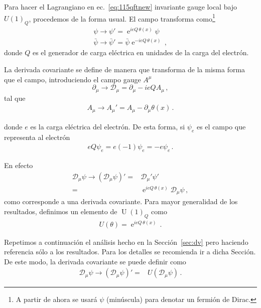 \begin{frame}
Para hacer el Lagrangiano en ec.~\eqref{eq:115qftnew} invariante gauge local bajo $U(1)_Q$, procedemos de la forma usual. El campo transforma como\footnote{A partir de ahora se usará $\psi$ (minúscula) para denotar un fermión de Dirac.}
\begin{align}
  \psi\to\psi'=\operatorname{e}^{ieQ\, \theta(x)}\psi\nonumber\\
  \bar{\psi}\to\bar{\psi}'=\bar{\psi}\operatorname{e}^{-ieQ\,\theta(x)}\,,
\end{align}
donde $Q$ es el generador de carga eléctrica en unidades de la carga del electrón.

La derivada covariante se define de manera que transforma de la misma forma que el campo, introduciendo el campo gauge $A^\mu$
\begin{equation}
  \label{eq:202qft}
  \partial_\mu\to\mathcal{D}_\mu=\partial_\mu-ieQA_\mu\,,
\end{equation}
tal que
\begin{align}
  A_{\mu}\to A_{\mu}'=A_{\mu}-\partial_{\mu}\theta(x)\,.
\end{align}

donde $e$ es la carga eléctrica del electrón. De esta forma, si $\psi_e$ es el campo que representa al electrón
\begin{align}
  eQ \psi_e=e(-1)\psi_e=-e \psi_e\,.
\end{align}

En efecto
\begin{align}
  \mathcal{D}_{\mu}\psi\to \left( \mathcal{D}_{\mu}\psi \right)'=&\mathcal{D}_{\mu}'\psi' \nonumber\\
=&\operatorname{e}^{ieQ\, \theta(x)}\mathcal{D}_{\mu}\psi\,,
\end{align}
como corresponde a una derivada covariante. Para mayor generalidad de los resultados, definimos un elemento de $\operatorname{U}(1)_Q$ como
\begin{align}
  U(\theta)=\operatorname{e}^{ieQ\, \theta(x)}\,.
\end{align}

Repetimos a continuación el análisis hecho en la Sección~\ref{sec:dv} pero haciendo referencia sólo a los resultados. Para los detalles se recomienda ir a dicha Sección. De este modo, la derivada covariante se puede definir como
\begin{align}
     \mathcal{D}_\mu \psi\to\left(\mathcal{D}_\mu \psi\right)'=&U\left(\mathcal{D}_\mu \psi\right)\,.
\end{align}


\end{frame}
